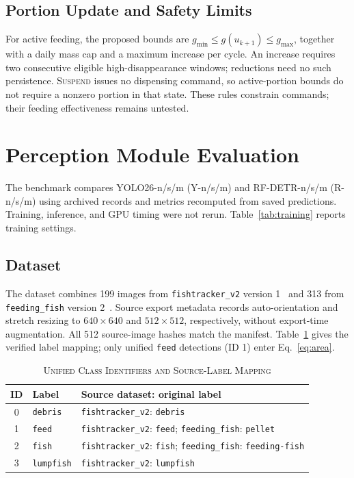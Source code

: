 \documentclass[10pt,conference,letterpaper]{IEEEtran}
\begin{document}
\subsection{Portion Update and Safety Limits}
For active feeding, the proposed bounds are $g_{\min}\le g(u_{k+1})\le g_{\max}$, together with a daily mass cap and a maximum increase per cycle. An increase requires two consecutive eligible high-disappearance windows; reductions need no such persistence. \textsc{Suspend} issues no dispensing command, so active-portion bounds do not require a nonzero portion in that state. These rules constrain commands; their feeding effectiveness remains untested.

\section{Perception Module Evaluation}
\label{sec:compare}
The benchmark compares YOLO26-n/s/m (Y-n/s/m) and RF-DETR-n/s/m (R-n/s/m) using archived records and metrics recomputed from saved predictions. Training, inference, and GPU timing were not rerun. Table~\ref{tab:training} reports training settings.

\subsection{Dataset}
The dataset combines 199 images from \texttt{fishtracker\_v2} version 1~\cite{fishtracker_dataset} and 313 from \texttt{feeding\_fish} version 2~\cite{feedingfish_dataset}. Source export metadata records auto-orientation and stretch resizing to $640\times640$ and $512\times512$, respectively, without export-time augmentation. All 512 source-image hashes match the manifest. Table~\ref{tab:labels} gives the verified label mapping; only unified \texttt{feed} detections (ID 1) enter Eq.~\eqref{eq:area}.

\begin{table}[H]
\caption{\textsc{Unified Class Identifiers and Source-Label Mapping}}
\label{tab:labels}
\centering
\footnotesize
\setlength{\tabcolsep}{3pt}
\begin{tabularx}{\columnwidth}{@{}c l >{\raggedright\arraybackslash}X@{}}
\toprule
\textbf{ID} & \textbf{Label} & \textbf{Source dataset: original label} \\ \midrule
0 & \texttt{debris} & \texttt{fishtracker\_v2}: \texttt{debris} \\
1 & \texttt{feed} & \texttt{fishtracker\_v2}: \texttt{feed}; \texttt{feeding\_fish}: \texttt{pellet} \\
2 & \texttt{fish} & \texttt{fishtracker\_v2}: \texttt{fish}; \texttt{feeding\_fish}: \texttt{feeding-fish} \\
3 & \texttt{lumpfish} & \texttt{fishtracker\_v2}: \texttt{lumpfish} \\ \bottomrule
\end{tabularx}
\end{table}
\end{document}
